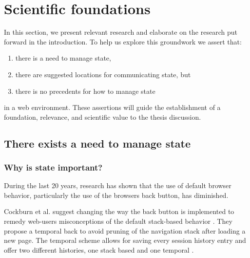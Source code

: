 \documentclass[english]{ifimaster}
\begin{document}
\section{Scientific foundations}
In this section, we present relevant research and elaborate on the research put forward in the introduction. To help us explore this groundwork we assert that:
\begin{enumerate}
\item there is a need to manage state,
\item there are suggested locations for communicating state, but
\item there is no precedents for how to manage state
\end{enumerate}

in a web environment. These assertions will guide the establishment of a foundation, relevance, and scientific value to the thesis discussion.

\subsection{There exists a need to manage state}

\subsubsection{Why is state important?}
During the last 20 years, research has shown that the use of default browser behavior, particularly the use of the browsers back button, has diminished.

Cockburn et al. suggest changing the way the back button is implemented to remedy web-users misconceptions of the default stack-based behavior \parencite{cockburn1996}. They propose a temporal back to avoid pruning of the navigation stack after loading a new page. The temporal scheme allows for saving every session history entry and offer two different histories, one stack based and one temporal \parencite{cockburn}. 
\end{document}
